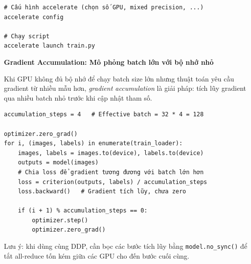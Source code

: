 \begin{verbatim}
# Cấu hình accelerate (chọn số GPU, mixed precision, ...)
accelerate config

# Chạy script
accelerate launch train.py
\end{verbatim}

\begin{mdframed}[style=infobox]
\textbf{Gradient Accumulation: Mô phỏng batch lớn với bộ nhớ nhỏ}

Khi GPU không đủ bộ nhớ để chạy batch size lớn nhưng thuật toán yêu cầu gradient từ nhiều mẫu hơn, \textit{gradient accumulation} là giải pháp: tích lũy gradient qua nhiều batch nhỏ trước khi cập nhật tham số.

\begin{verbatim}
accumulation_steps = 4   # Effective batch = 32 * 4 = 128

optimizer.zero_grad()
for i, (images, labels) in enumerate(train_loader):
    images, labels = images.to(device), labels.to(device)
    outputs = model(images)
    # Chia loss để gradient tương đương với batch lớn hơn
    loss = criterion(outputs, labels) / accumulation_steps
    loss.backward()   # Gradient tích lũy, chưa zero

    if (i + 1) % accumulation_steps == 0:
        optimizer.step()
        optimizer.zero_grad()
\end{verbatim}

Lưu ý: khi dùng cùng DDP, cần bọc các bước tích lũy bằng \texttt{model.no\_sync()} để tắt all-reduce tốn kém giữa các GPU cho đến bước cuối cùng.
\end{mdframed}
